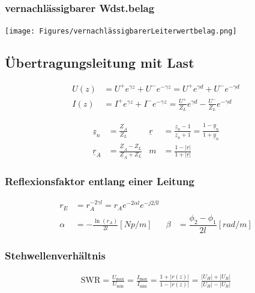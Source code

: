 \subsubsection{vernachlässigbarer Wdst.belag}
\texttt{[image: Figures/vernachlässigbarerLeiterwertbelag.png]}

\subsection{Übertragungsleitung mit Last}



\begin{align*}
    U(z) & = U^+ e^{\gamma z} + U^- e^{-\gamma z} = U^+ e^{\gamma d} + U^ - e^{-\gamma d}                      \\
    I(z) & = I^+ e^{\gamma z} + I^- e^{-\gamma z} = \frac{U^+}{Z_L}e^{\gamma d} - \frac{U^-}{Z_L}e^{-\gamma d}
\end{align*}

\begin{align*}
    \underline{z}_n & = \frac{\underline{Z}_A}{Z_L}                     & \underline{r} & = \frac{\underline{z}_n-1}{\underline{z}_n+1}= \frac{1-\underline{y}_n}{1+\underline{y}_n} \\
    \underline{r}_A & = \frac{\underline{Z}_A-Z_L}{\underline{Z}_A+Z_L} & m             & = \frac{1-|\underline{r}|}{1+|\underline{r}|}
\end{align*}

\subsubsection{Reflexionsfaktor entlang einer Leitung}
\begin{align*}
    r_E    & = r_A  ^{-2\gamma l} = r_A  e^{-2\alpha l} e^{-j2\beta l}                                                     \\
    \alpha & = -\frac{\ln(r_A)}{2l} [\si{Np/m}]                        & \beta & = \dfrac{\phi_2 -\phi_1}{2l} [\si{rad/m}]
\end{align*}

\subsubsection{Stehwellenverhältnis}
\begin{align*}
    \mathrm{SWR} = \frac{U_\text{max}}{U_\text{min}} =
    \frac{I_\text{max}}{I_\text{min}} = \frac{1+|r(z)|}{1-|r(z)|} =
    \frac{|U_H|+|U_R|}{|U_H|-|U_R|}
\end{align*}

